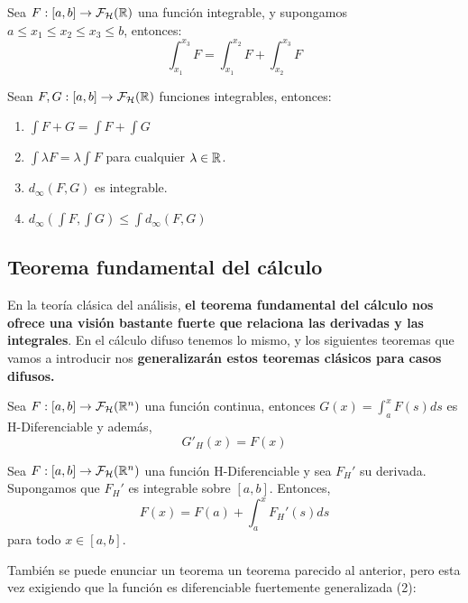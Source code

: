 \begin{teorema}
  Sea $F :  [a, b] \rightarrow \mathcal{F}_\mathcal{H}(\mathbb R)$ una función integrable, y supongamos $a \leq x_1 \leq x_2 \leq x_3 \leq b$, entonces:
  \[
  \int_{x_1}^{x_3} F = \int_{x_1}^{x_2} F + \int_{x_2}^{x_3} F
  \]
\end{teorema}

\begin{teorema}
  Sean $F, G :  [a, b] \rightarrow \mathcal{F}_\mathcal{H}(\mathbb R)$ funciones integrables, entonces:
  
  \begin{enumerate}
  \item $\int F + G = \int F + \int G$
  \item $\int \lambda F = \lambda \int F$ para cualquier $\lambda \in \mathbb R$.
  \item $d_\infty(F, G)$ es integrable.
  \item $d_\infty(\int F, \int G) \leq \int d_\infty(F, G)$
  \end{enumerate}
\end{teorema}

\subsection{Teorema fundamental del cálculo}
En la teoría clásica del análisis, \textbf{el teorema fundamental del cálculo nos ofrece una visión bastante fuerte que relaciona las derivadas y las integrales}. En el cálculo difuso tenemos lo mismo, y los siguientes teoremas que vamos a introducir nos \textbf{generalizarán estos teoremas clásicos para casos difusos.}

\begin{teorema}
  Sea $F : [a, b] \rightarrow \mathcal{F}_\mathcal{H} (\mathbb R^n)$ una función continua, entonces $G(x) = \int_{a}^{x} F(s) ds$ es H-Diferenciable y además,
  \[
  G'_H(x) = F(x)
  \]
\end{teorema}

\begin{teorema}
  Sea $F : [a, b] \rightarrow  \mathcal{F}_\mathcal{H} (\mathbb R^n)$ una función H-Diferenciable y sea $F_H'$ su derivada. Supongamos que $F_H'$ es integrable sobre $[a, b]$. Entonces,
  \[
  F(x) = F(a) + \int_{a}^{x}F_H'(s) ds
  \]
  para todo $x \in [a, b]$.
\end{teorema}

También se puede enunciar un teorema un teorema parecido al anterior, pero esta vez exigiendo que la función es diferenciable fuertemente generalizada (2):

